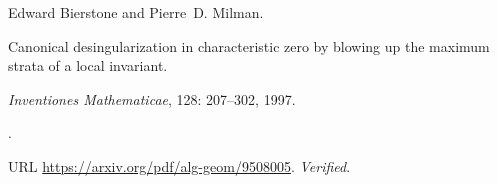 Edward Bierstone and Pierre~D. Milman.

\newblock Canonical desingularization in characteristic zero by blowing up the
  maximum strata of a local invariant.

\newblock \emph{Inventiones Mathematicae}, 128: 207--302, 1997.

\newblock {}.

\newblock URL \url{https://arxiv.org/pdf/alg-geom/9508005}.
\newblock \emph{Verified}.

